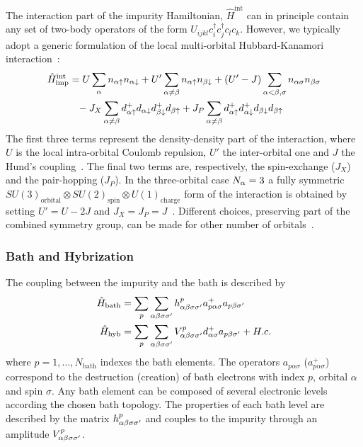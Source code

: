 \documentclass[edipack2.tex]{subfiles}
\begin{document}
The interaction part of the impurity Hamiltonian, 
 $\hat{H}^{\mathrm{int}}$ can in principle contain any 
set of two-body operators of the form
$U_{ijkl}c^{\dagger}_{i}c^{\dagger}_{j}c_{l}c_{k}$.
However, we typically 
adopt a generic formulation of the local multi-orbital Hubbard-Kanamori interaction~\cite{Georges2013ACMP}:
\begin{equation}\label{Hint}
  \begin{split}
    \hat{H}^\mathrm{int}_\mathrm{imp} &=U\sum_{\a}n_{\a\uparrow}n_{\a\downarrow}+U'\sum_{\a\neq \b}n_{\a\uparrow}n_{\b\downarrow}+(U'-J)\sum_{\a<\b,\sigma}n_{\a\sigma}n_{\b\sigma}\\
    &{\phantom =}- J_X\sum_{\a\neq
      \b}d^{+}_{\a\uparrow}d_{\a\downarrow}d^{+}_{\b\downarrow}d_{\b\uparrow}+J_P\sum_{\a
      \neq
      \b}d^{+}_{\a\uparrow}d^{+}_{\a\downarrow}d_{\b\downarrow}d_{\b\uparrow}\\
\end{split}
\end{equation}
The first three terms represent the density-density part of the
interaction, where $U$ is the local intra-orbital Coulomb repulsion,
$U'$ the inter-orbital one and $J$ the Hund's coupling~\cite{Georges2013ACMP}.  
The final two terms are, respectively, the spin-exchange ($J_X$) and
the pair-hopping ($J_P$).
In the three-orbital case $N_\alpha=3$ a fully symmetric $SU(3)_\mathrm{orbital}\otimes SU(2)_\mathrm{spin}\otimes
U(1)_\mathrm{charge}$ form of the interaction is obtained by setting $U'=U-2J$ and
$J_X=J_P=J$~\cite{Georges2013ACMP}. Different choices, preserving part
of the combined symmetry group, can be made for other number of orbitals~\cite{Georges2013ACMP}. 

\subsubsection{Bath and Hybrization}
The coupling between the impurity and the bath is described by
\begin{equation}\label{Hbath}
  \begin{split}
    \hat{H}_\mathrm{bath} &=
    \sum_p\sum_{\alpha\beta\sigma\sigma'}h^p_{\alpha\beta\sigma\sigma'}a^{+}_{p\alpha\sigma}a_{p\beta\sigma'}\\
    \hat{H}_\mathrm{hyb} &= \sum_p\sum_{\alpha\beta\sigma\sigma'}V^p_{\alpha\beta\sigma\sigma'}d^{+}_{\alpha\sigma}a_{p\beta\sigma'}+H.c. \\
\end{split}
\end{equation}
where $p=1,\dots,N_\mathrm{bath}$ indexes the
bath elements. The operators $a_{p\alpha\sigma}$
($a^+_{p\alpha\sigma}$) correspond to the destruction (creation) of
bath electrons with index $p$, orbital $\alpha$ and spin $\sigma$.
Any bath element can be composed of several electronic levels
according the chosen bath topology. The  properties of each bath level are described by the
matrix $h^p_{\alpha\beta\sigma\sigma'}$ and couples to the impurity through an amplitude
$V^p_{\alpha\beta\sigma\sigma'}$.   
\end{document}
